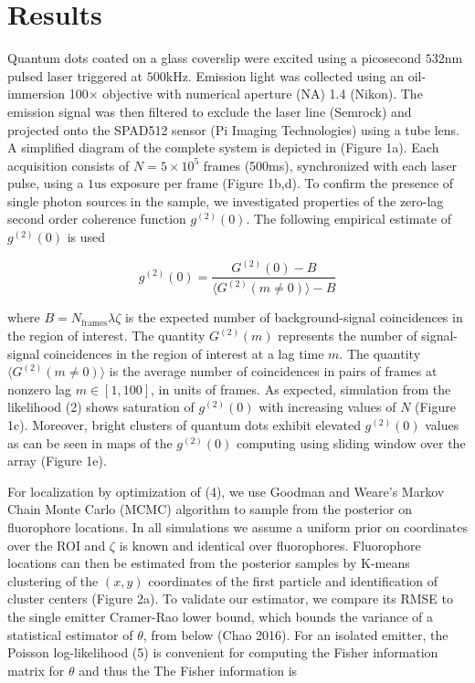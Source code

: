\section{Results}

Quantum dots coated on a glass coverslip were excited using a picosecond $532\mathrm{nm}$ pulsed laser triggered at $500\mathrm{kHz}$. Emission light was collected using an oil-immersion 100$\times$ objective with numerical aperture (NA) 1.4 (Nikon). The emission signal was then filtered to exclude the laser line (Semrock) and projected onto the SPAD512 sensor (Pi Imaging Technologies) using a tube lens. A simplified diagram of the complete system is depicted in (Figure 1a). Each acquisition consists of $N=5\times 10^{5}$ frames (500ms), synchronized with each laser pulse, using a $1\mathrm{us}$ exposure per frame (Figure 1b,d). To confirm the presence of single photon sources in the sample, we investigated properties of the zero-lag second order coherence function $g^{(2)}(0)$. The following empirical estimate of $g^{(2)}(0)$ is used \parencite{Israel2017}

\begin{equation}
g^{(2)}(0) = \frac{G^{(2)}(0)-B}{\langle G^{(2)}(m\neq 0)\rangle -B}
\end{equation}

where $B = N_{\mathrm{frames}}\lambda\zeta$ is the expected number of background-signal coincidences in the region of interest. The quantity $G^{(2)}(m)$ represents the number of signal-signal coincidences in the region of interest at a lag time $m$. The quantity $\langle G^{(2)}(m\neq 0)\rangle$ is the average number of coincidences in pairs of frames at nonzero lag $m \in [1,100]$, in units of frames. As expected, simulation from the likelihood (2) shows saturation of $g^{(2)}(0)$  with increasing values of $N$ (Figure 1c). Moreover, bright clusters of quantum dots exhibit elevated $g^{(2)}(0)$ values as can be seen in maps of the $g^{(2)}(0)$ computing using sliding window over the array (Figure 1e).

For localization by optimization of (4), we use Goodman and Weare's Markov Chain Monte Carlo (MCMC) algorithm \parencite{Goodman2010} to sample from the posterior on fluorophore locations. In all simulations we assume a uniform prior on coordinates over the ROI and $\zeta$ is known and identical over fluorophores. Fluorophore locations can then be estimated from the posterior samples by K-means clustering of the $(x,y)$ coordinates of the first particle and identification of cluster centers (Figure 2a). To validate our estimator, we compare its RMSE to the single emitter Cramer-Rao lower bound, which bounds the variance of a statistical estimator of $\theta$, from below (Chao 2016). For an isolated emitter, the Poisson log-likelihood (5) is convenient for computing the Fisher information matrix for $\theta$ and thus the The Fisher information is \parencite{Smith2010}

